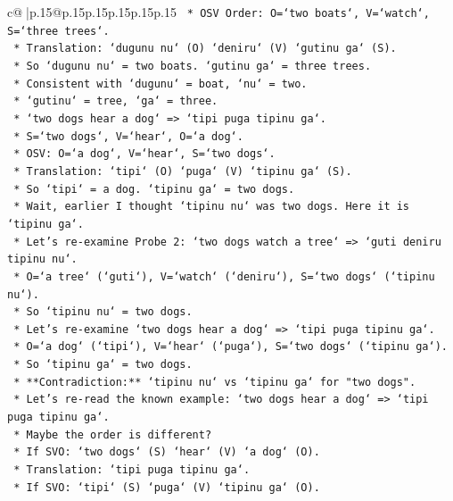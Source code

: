 \documentclass{article}
\begin{document}
{\begin{supertabular}{c@{$\;$}|p{.15\linewidth}@{}p{.15\linewidth}p{.15\linewidth}p{.15\linewidth}p{.15\linewidth}p{.15\linewidth}}
{{{\texttt{        *   OSV Order: O=`two boats`, V=`watch`, S=`three trees`.} \\
\texttt{        *   Translation: `dugunu nu` (O) `deniru` (V) `gutinu ga` (S).} \\
\texttt{        *   So `dugunu nu` = two boats. `gutinu ga` = three trees.} \\
\texttt{        *   Consistent with `dugunu` = boat, `nu` = two.} \\
\texttt{        *   `gutinu` = tree, `ga` = three.} \\
\texttt{    *   `two dogs hear a dog` => `tipi puga tipinu ga`.} \\
\texttt{        *   S=`two dogs`, V=`hear`, O=`a dog`.} \\
\texttt{        *   OSV: O=`a dog`, V=`hear`, S=`two dogs`.} \\
\texttt{        *   Translation: `tipi` (O) `puga` (V) `tipinu ga` (S).} \\
\texttt{        *   So `tipi` = a dog. `tipinu ga` = two dogs.} \\
\texttt{        *   Wait, earlier I thought `tipinu nu` was two dogs. Here it is `tipinu ga`.} \\
\texttt{        *   Let's re{-}examine Probe 2: `two dogs watch a tree` => `guti deniru tipinu nu`.} \\
\texttt{            *   O=`a tree` (`guti`), V=`watch` (`deniru`), S=`two dogs` (`tipinu nu`).} \\
\texttt{            *   So `tipinu nu` = two dogs.} \\
\texttt{        *   Let's re{-}examine `two dogs hear a dog` => `tipi puga tipinu ga`.} \\
\texttt{            *   O=`a dog` (`tipi`), V=`hear` (`puga`), S=`two dogs` (`tipinu ga`).} \\
\texttt{            *   So `tipinu ga` = two dogs.} \\
\texttt{        *   **Contradiction:** `tipinu nu` vs `tipinu ga` for "two dogs".} \\
\texttt{        *   Let's re{-}read the known example: `two dogs hear a dog` => `tipi puga tipinu ga`.} \\
\texttt{        *   Maybe the order is different?} \\
\texttt{        *   If SVO: `two dogs` (S) `hear` (V) `a dog` (O).} \\
\texttt{        *   Translation: `tipi puga tipinu ga`.} \\
\texttt{        *   If SVO: `tipi` (S) `puga` (V) `tipinu ga` (O).} \\
}}}
\end{supertabular}}
\end{document}
